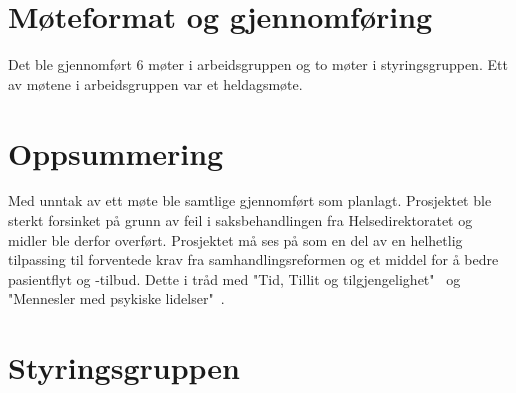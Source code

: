 \documentclass[11pt]{report} %
\begin{document}
                \section{Møteformat og gjennomføring}\label{sec:m_form}
                  Det ble gjennomført 6 møter i arbeidsgruppen og to møter i styringsgruppen. Ett av møtene i arbeidsgruppen var et heldagsmøte.
                \section{Oppsummering}\label{sec:m_sum}  
                  Med unntak av ett møte ble samtlige gjennomført som planlagt. Prosjektet ble sterkt forsinket på grunn av feil i saksbehandlingen fra Helsedirektoratet og midler ble derfor overført. Prosjektet må ses på som en del av en helhetlig tilpassing til forventede krav fra samhandlingsreformen og et middel for å bedre pasientflyt og -tilbud. Dette i tråd med "Tid, Tillit og tilgjengelighet"~\cite{tid_til_tilgj} og "Mennesler med psykiske lidelser"~\cite{m_psyk_lid}.
                \section{Styringsgruppen}\label{sec:m_stygr}
\end{document}

